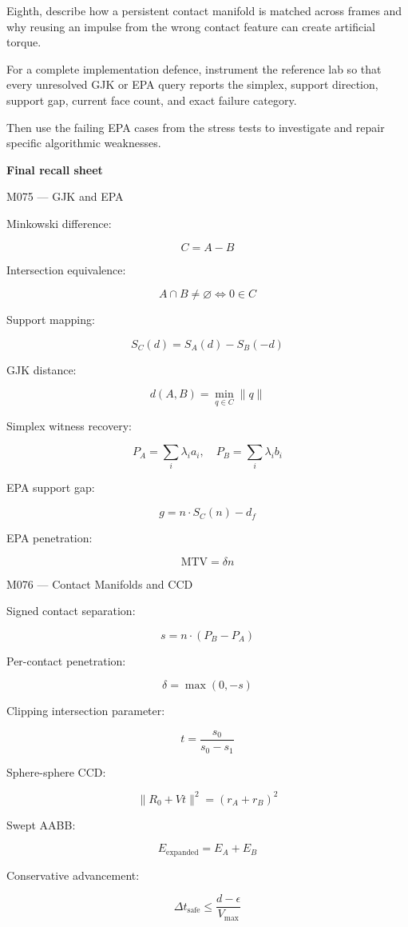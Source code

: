 Eighth, describe how a persistent contact manifold is matched across frames and why reusing an impulse from the wrong contact feature can create artificial torque.

For a complete implementation defence, instrument the reference lab so that every unresolved GJK or EPA query reports the simplex, support direction, support gap, current face count, and exact failure category.

Then use the failing EPA cases from the stress tests to investigate and repair specific algorithmic weaknesses.

\textbf{Final recall sheet}

M075 --- GJK and EPA

Minkowski difference:

\[
C=A-B
\]

Intersection equivalence:

\[
\boxed{A\cap B\ne\varnothing\iff0\in C}
\]

Support mapping:

\[
\boxed{S_C(d)=S_A(d)-S_B(-d)}
\]

GJK distance:

\[
\boxed{d(A,B)=\min_{q\in C}\|q\|}
\]

Simplex witness recovery:

\[
\boxed{P_A=\sum_i\lambda_ia_i,\quad P_B=\sum_i\lambda_ib_i}
\]

EPA support gap:

\[
\boxed{g=n\cdot S_C(n)-d_f}
\]

EPA penetration:

\[
\boxed{\mathrm{MTV}=\delta n}
\]

M076 --- Contact Manifolds and CCD

Signed contact separation:

\[
\boxed{s=n\cdot(P_B-P_A)}
\]

Per-contact penetration:

\[
\boxed{\delta=\max(0,-s)}
\]

Clipping intersection parameter:

\[
\boxed{t=\frac{s_0}{s_0-s_1}}
\]

Sphere-sphere CCD:

\[
\boxed{\|R_0+Vt\|^2=(r_A+r_B)^2}
\]

Swept AABB:

\[
\boxed{E_{\mathrm{expanded}}=E_A+E_B}
\]

Conservative advancement:

\[
\boxed{\Delta t_{\mathrm{safe}}\le\frac{d-\epsilon}{V_{\max}}}
\]

